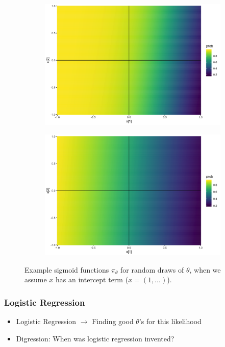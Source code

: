 \documentclass[10pt,mathserif]{beamer}
\begin{document}
\begin{frame}
\begin{figure}
\begin{subfigure}{.1\textwidth}
    \end{subfigure}
    \begin{subfigure}{.1\textwidth}
      \centering
      \includegraphics[width=0.1\paperwidth]{figure/sigmoid_plot_9}
    \end{subfigure}
    \begin{subfigure}{.1\textwidth}
      \centering
      \includegraphics[width=0.1\paperwidth]{figure/sigmoid_plot_10}
    \end{subfigure}
    \caption{Example sigmoid functions $\pi_{\theta}$ for random draws of
      $\theta$, when we assume $x$ has an intercept term ($x = \left(1,
      \dots\right)$).
      \label{fig:logistic_scatter_nonlinear} }
  \end{figure}
\end{frame}

\begin{frame}
  \frametitle{Logistic Regression}
  \begin{itemize}
  \item Logistic Regression $\rightarrow$ Finding good $\theta$'s for this
    likelihood
  \item Digression: When was logistic regression invented?
  \end{itemize}
\end{frame}
\end{document}
